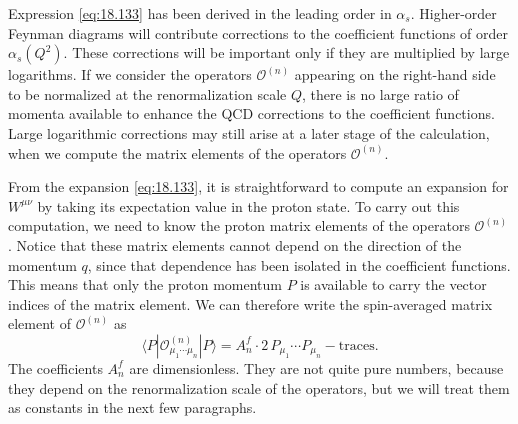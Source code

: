 Expression \eqref{eq:18.133} has been derived in the leading order in
$\alpha_s$.  Higher-order Feynman diagrams will contribute corrections to the
coefficient functions of order $\alpha_s(Q^2)$.  These corrections will be
important only if they are multiplied by large logarithms.  If we consider
the operators $\mathcal{O}^{(n)}$ appearing on the right-hand side to be
normalized at the renormalization scale $Q$, there is no large ratio of
momenta available to enhance the QCD corrections to the coefficient
functions.  Large logarithmic corrections may still arise at a later stage of
the calculation, when we compute the matrix elements of the operators
$\mathcal{O}^{(n)}$.

From the expansion \eqref{eq:18.133}, it is straightforward to compute an
expansion for $W^{\mu\nu}$ by taking its expectation value in the proton
state.  To carry out this computation, we need to know the proton matrix
elements of the operators $\mathcal{O}^{(n)}$.  Notice that these matrix
elements cannot depend on the direction of the momentum $q$, since that
dependence has been isolated in the coefficient functions.  This means that
only the proton momentum $P$ is available to carry the vector indices of the
matrix element.  We can therefore write the spin-averaged matrix element of
$\mathcal{O}^{(n)}$ as
\begin{equation}
  \langle P|\mathcal{O}^{(n)}_{\mu_1\cdots\mu_n}|P\rangle = A_n^f\cdot
    2\,P_{\mu_1}\cdots P_{\mu_n} - \text{traces} .
  \label{eq:18.134}
\end{equation}
The coefficients $A_n^f$ are dimensionless.  They are not quite pure numbers,
because they depend on the renormalization scale of the operators, but we
will treat them as constants in the next few paragraphs.

